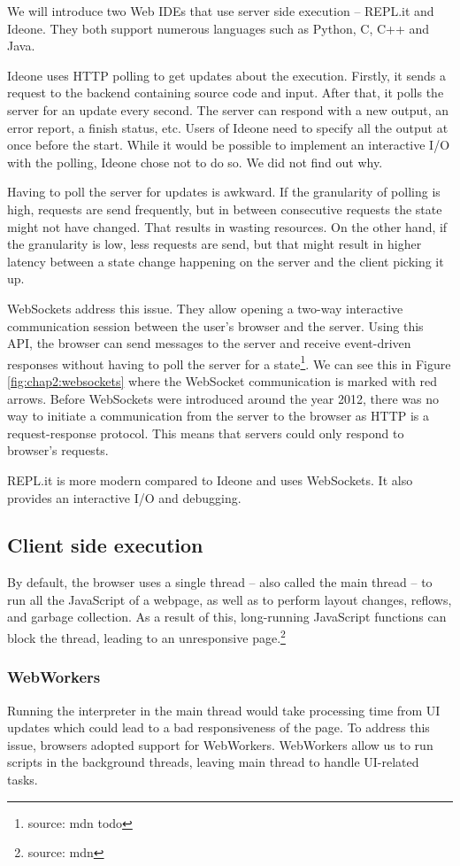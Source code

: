 We will introduce two Web IDEs that use server side execution -- REPL.it and Ideone. They both support numerous languages such
as Python, C, C++ and Java.

Ideone uses HTTP polling to get updates about the execution. Firstly, it sends a request to the backend containing source code and input.
After that, it polls the server for an update every second. The server can respond with a new output, an error report, a finish status, etc. Users of Ideone need to
specify all the output at once before the start. While it would be possible to implement an interactive I/O with the polling, Ideone chose not to do so.
We did not find out why.

Having to poll the server for updates is awkward. If the granularity of polling is high, requests are send frequently, but
in between consecutive requests the state might not have changed. That results in wasting resources. On the other hand, if the granularity is low, less
requests are send, but that might result in higher latency between a state change happening on the server and the client picking it up.

WebSockets address this issue. They allow opening a two-way interactive communication session between the user's browser and the server.
Using this API, the browser can send messages to the server and receive event-driven responses without having to poll the server for a state\footnote{source: mdn todo}.
We can see this in Figure \ref{fig:chap2:websockets} where the WebSocket communication is marked with red arrows.
Before WebSockets were introduced around the year 2012, there was no way to initiate a communication from the server to the browser as HTTP is a request-response
protocol. This means that servers could only respond to browser's requests.

REPL.it is more modern compared to Ideone and uses WebSockets. It also provides an interactive I/O and debugging.

\subsection{Client side execution}
By default, the browser uses a single thread -- also called the main thread -- to run all the JavaScript of a webpage, as well as to perform layout
changes, reflows, and garbage collection. As a result of this, long-running JavaScript functions can block the thread, leading to an unresponsive
page.\footnote{source: mdn}

\subsubsection{WebWorkers}
Running the interpreter in the main thread would take processing time from UI updates which could lead to a bad responsiveness of the page. To
address this issue, browsers adopted support for WebWorkers. WebWorkers allow us to run scripts in the background threads, leaving main thread
to handle UI-related tasks.

